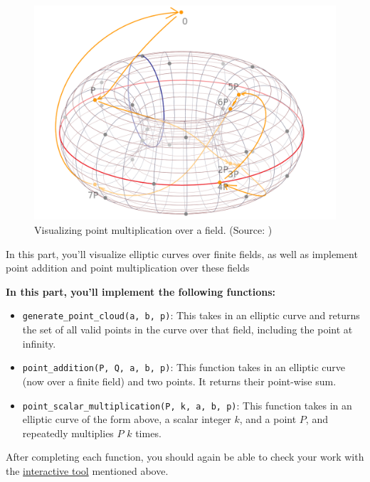 \documentclass{article}
\begin{document}
    \begin{figure}[htbp]
        \centering
        \includegraphics[scale = 0.25]{sp23/hw-supplements/hw7-supp/images/point_multiplication_over_field.png}
        \caption{Visualizing point multiplication over a field. (Source: \cite{curve_visualization})}
        \label{fig:point_multiplication_over_field}
    \end{figure}

    \begin{tcolorbox}[enhanced,interior style={top color=Plum!20,bottom color=Plum!30}]
        In this part, you'll visualize elliptic curves over finite fields, as well as implement point addition and point multiplication over these fields
    
        \textbf{In this part, you'll implement the following functions:}
        \begin{itemize}
            \item \lstinline{generate_point_cloud(a, b, p)}: This takes in an elliptic curve and returns the set of all valid points in the curve over that field, including the point at infinity.
            \item \lstinline{point_addition(P, Q, a, b, p)}: This function takes in an elliptic curve (now over a finite field) and two points. It returns their point-wise sum.
            \item \lstinline{point_scalar_multiplication(P, k, a, b, p)}: This function takes in an elliptic curve of the form above, a scalar integer $k$, and a point $P$, and repeatedly multiplies $P$ $k$ times.
        \end{itemize}
        After completing each function, you should again be able to check your work with the \href{https://andrea.corbellini.name/ecc/interactive/reals-add.html}{interactive tool} mentioned above.
    \end{tcolorbox}
\end{document}
